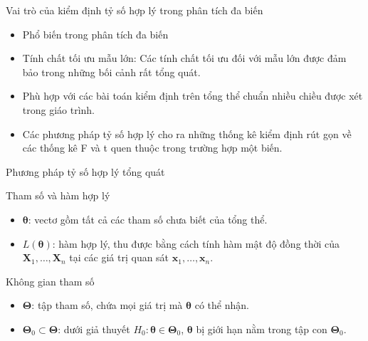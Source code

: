 \begin{frame}[t]{Vai trò của kiểm định tỷ số hợp lý trong phân tích đa biến}
  \begin{block}{}
    \begin{itemize}
      \setlength{\itemsep}{8pt}
      \item Phổ biến trong phân tích đa biến
      \item Tính chất tối ưu mẫu lớn: Các tính chất tối ưu đối với mẫu lớn được đảm bảo trong những bối cảnh rất tổng quát.
      \item Phù hợp với các bài toán kiểm định trên tổng thể chuẩn nhiều chiều được xét trong giáo trình.
      \item Các phương pháp tỷ số hợp lý cho ra những thống kê kiểm định rút gọn về các thống kê F và t quen thuộc trong trường hợp một biến.
    \end{itemize}
  \end{block}
\end{frame}

\begin{frame}[t]{Phương pháp tỷ số hợp lý tổng quát}
  \begin{block}{Tham số và hàm hợp lý}
    \begin{itemize}
      \setlength{\itemsep}{6pt}
      \item $\boldsymbol{\theta}$: vectơ gồm tất cả các tham số chưa biết của tổng thể.
      \item $L(\boldsymbol{\theta})$: hàm hợp lý, thu được bằng cách tính hàm mật độ đồng thời của $\mathbf{X}_1, \dots, \mathbf{X}_n$ tại các giá trị quan sát $\mathbf{x}_1, \dots, \mathbf{x}_n$.
    \end{itemize}
  \end{block}

  \begin{exampleblock}{Không gian tham số}
    \begin{itemize}
      \setlength{\itemsep}{6pt}
      \item $\boldsymbol{\Theta}$: tập tham số, chứa mọi giá trị mà $\boldsymbol{\theta}$ có thể nhận.
      \item $\boldsymbol{\Theta}_0 \subset \boldsymbol{\Theta}$: dưới giả thuyết $H_0: \boldsymbol{\theta} \in \boldsymbol{\Theta}_0$, $\boldsymbol{\theta}$ bị giới hạn nằm trong tập con $\boldsymbol{\Theta}_0$.
    \end{itemize}
  \end{exampleblock}
\end{frame}


